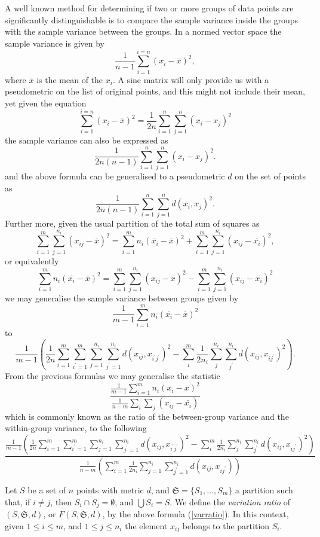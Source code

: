 \documentclass[12pt]{article}
\begin{document}
A well known method for determining if two or more groups of data points are significantly distinguishable is to compare the sample variance inside the groups with the sample variance between the groups. In a normed vector space the sample variance is given by
$$
\frac{1}{n-1} \sum_{i = 1}^{i = n} (x_i - \bar{x})^{2},
$$
where $\bar{x}$ is the mean of the $x_i$. A sine matrix will only provide us with a pseudometric on the list of original points, and this might not include their mean, yet given the equation
$$
\sum_{i = 1}^{i = n} (x_i - \bar{x})^{2} = \frac{1}{2n} \sum_{i=1}^n\sum_{j=1}^n (x_i - x_j)^2
$$the sample variance can also be expressed as
$$
\frac{1}{2n(n-1)} \sum_{i=1}^n\sum_{j=1}^n(x_i - x_j)^2.
$$
and the above formula can be generalised to a pseudometric $d$ on the set of points as
$$
\frac{1}{2n(n-1)} \sum_{i=1}^n\sum_{j=1}^nd(x_i, x_j)^2.
$$
Further more, given the usual partition of the total sum of squares as 
$$
\sum_{i=1}^m\sum_{j=1}^{n_i}(x_{ij} - \bar{x})^2 = \sum_{i=1}^m n_i(\bar{x_i} - \bar{x})^2 + \sum_{i=1}^m \sum_{j=1}^{n_i} (x_{ij} - \bar{x_i})^2,
$$
or equivalently
$$
\sum_{i=1}^m n_i(\bar{x_i} - \bar{x})^2 = \sum_{i=1}^m\sum_{j=1}^{n_i}(x_{ij} - \bar{x})^2 - \sum_{i=1}^m\sum_{j=1}^{n_i}(x_{ij} - \bar{x_i})^2
$$
we may generalise the sample variance between groups given by
$$
 \frac{1}{m - 1}\sum_{i=1}^{m} n_i(\bar{x_i} - \bar{x})^2
$$
to
$$
\frac{1}{m-1}\left( \frac{1}{2n}\sum_{i=1}^m\sum_{i^\prime=1}^m\sum_{j=1}^{n_i}\sum_{j^\prime=1}^{n_i}d(x_{ij},x_{i^\prime j^\prime})^2 - \sum_i^{m} \frac{1}{2n_i}\sum_{ j}^{n_i}\sum_{ j^\prime}^{n_i} d(x_{ij}, x_{ij^\prime})^2 \right).
 $$
 From the previous formulas we may generalise the statistic
$$
 \frac{\frac{1}{m-1} \sum_{i=1}^{m} n_i(\bar{x_i} - \bar{x})^2}{\frac{1}{n-m}\sum_i \sum_j (x_{ij} - \bar{x_i})}
 $$
 which is commonly known as the ratio of the between-group variance and the within-group variance, to the following
\begin{equation} \label{varratio}
 \frac{\displaystyle{\frac{1}{m-1}}\left( \displaystyle{ \frac{1}{2n}\sum_{i=1}^m\sum_{i^\prime=1}^m\sum_{j=1}^{n_i}\sum_{j^\prime=1}^{n_i}d(x_{ij},x_{i^\prime j^\prime})^2 - \sum_i^m \frac{1}{2n_i}\sum_{j}^{n_i} \sum_{j^\prime}^{n_i} d(x_{ij}, x_{ij^\prime})^2} \right)}{\displaystyle{\frac{1}{n-m}} \left(\displaystyle{\sum_{i=1}^m \frac{1}{2n_i}\sum_{j=1}^{n_i} \sum_{j^\prime = 1}^{n_i}d(x_{ij}, x_{ij^\prime})} \right)} \tag{$\ast$}
\end{equation}

Let $S$ be a set of $n$ points with metric $d$, and $\mathfrak{S} = \{ S_1, \ldots, S_m \}$ a partition such that, if $i \neq j$, then $S_i \cap S_j = \emptyset$, and $\bigcup S_i = S$. We define the \emph{variation ratio} of $(S, \mathfrak{S}, d)$, or $F(S,\mathfrak{S}, d)$, by the above formula (\ref{varratio}). In this context, given $1 \leq i \leq m$, and $1 \leq j \leq n_i$ the element $x_{ij}$ belongs to the partition $S_i$.  
\end{document}
